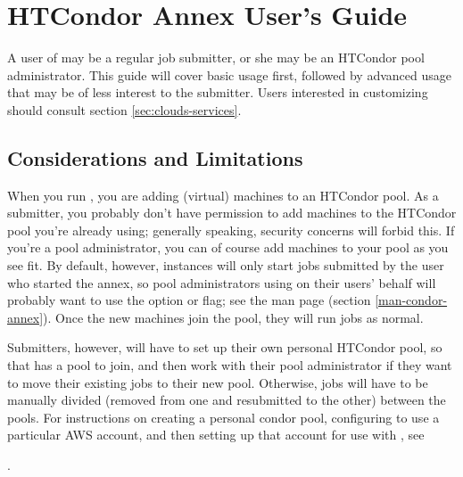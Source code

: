 \section{\label{sec:clouds-annex}HTCondor Annex User's Guide}

A user of  may be a regular job submitter, or she may be an
HTCondor pool administrator.  This guide will cover basic  usage
first, followed by advanced usage that may be of less interest to the
submitter.  Users interested in customizing  should consult
section \ref{sec:clouds-services}.

\subsection{Considerations and Limitations}

When you run , you are adding (virtual) machines to an HTCondor
pool.  As a submitter, you probably don't have permission to add machines to
the HTCondor pool you're already using; generally speaking, security concerns
will forbid this.  If you're a pool administrator, you can of course add
machines to your pool as you see fit.  By default, however, 
instances will only start jobs submitted by the user who started the annex,
so pool administrators using  on their users' behalf will
probably want to use the  option or  flag;
see the man page (section \ref{man-condor-annex}).  Once the new machines
join the pool, they will run jobs as normal.

Submitters, however, will have to set up their own personal HTCondor pool,
so that  has a pool to join, and then work with their pool
administrator if they want to move their existing jobs to their new pool.
Otherwise, jobs will have to be manually divided (removed from one and
resubmitted to the other) between the pools.  For instructions on creating a
personal condor pool, configuring  to use a particular AWS
account, and then setting up that account for use with , see


.

